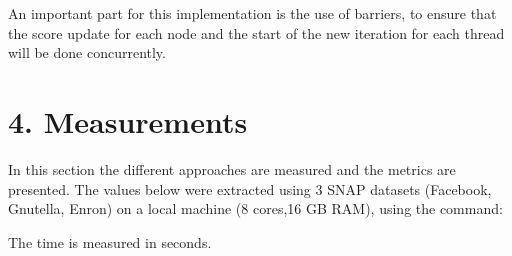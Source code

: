 \documentclass{article}
\begin{document}


An important part for this implementation is the use of barriers, to ensure that the score update for each node and the start of the new iteration for each thread will be done concurrently.



\section*{4. Measurements}
In this section the different approaches are measured and the metrics are presented. The values below were extracted using 3 SNAP datasets (Facebook, Gnutella, Enron) on a local machine (8 cores,16 GB RAM), using the command:

The time is measured in seconds.
\end{document}
